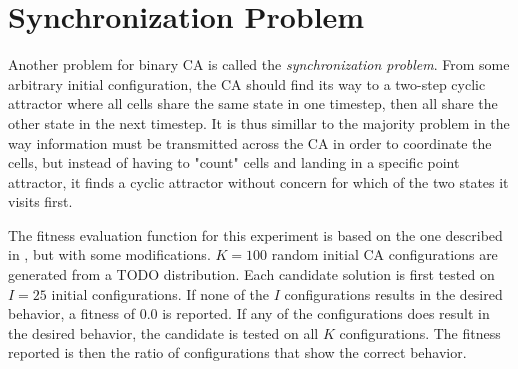 \section{Synchronization Problem}
Another problem for binary CA is called the \textit{synchronization problem}.
From some arbitrary initial configuration,
the CA should find its way to a two-step cyclic attractor where all cells share the same state in one timestep,
then all share the other state in the next timestep.
It is thus simillar to the majority problem in the way information must be transmitted across the CA in order to coordinate the cells,
but instead of having to "count" cells and landing in a specific point attractor, it finds a cyclic attractor without concern for which of the two states it visits first.

The fitness evaluation function for this experiment is based on the one described in \cite{das1995evolving}, but with some modifications.
$K=100$ random initial CA configurations are generated from a TODO distribution.
Each candidate solution is first tested on $I=25$ initial configurations.
If none of the $I$ configurations results in the desired behavior, a fitness of $0.0$ is reported.
If any of the configurations does result in the desired behavior, the candidate is tested on all $K$ configurations.
The fitness reported is then the ratio of configurations that show the correct behavior.

